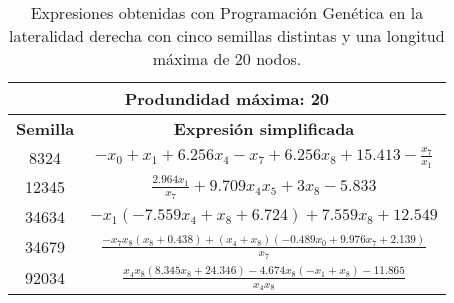 \begin{table}[H]
\centering
\begin{tabular}{|c|c|}
\hline
\multicolumn{2}{|c|}{\textbf{Produndidad máxima: 20}}                                                                                                               \\ \hline
\textbf{Semilla} & \textbf{Expresión simplificada}                                                                                                                  \\ \hline
8324             & $- x_{0} + x_{1} + 6.256 x_{4} - x_{7} + 6.256 x_{8} + 15.413 - \frac{x_{7}}{x_{1}}$                                              \\ \hline
12345            & $\frac{2.964 x_{1}}{x_{7}} + 9.709 x_{4} x_{5} + 3 x_{8} - 5.833$                                                                       \\ \hline
34634            & $- x_{1} \left(- 7.559 x_{4} + x_{8} + 6.724\right) + 7.559 x_{8} + 12.549$                                                          \\ \hline
34679            & $\frac{- x_{7} x_{8} \left(x_{8} + 0.438\right) + \left(x_{4} + x_{8}\right) \left(- 0.489 x_{0} + 9.976 x_{7} + 2.139\right)}{x_{7}}$ \\ \hline
92034            & $\frac{x_{4} x_{8} \left(8.345 x_{8} + 24.346\right) - 4.674 x_{8} \left(- x_{1} + x_{8}\right) - 11.865}{x_{4} x_{8}}$  \\ \hline
\end{tabular}%
\caption{Expresiones obtenidas con Programación Genética en la lateralidad derecha con cinco semillas distintas y una longitud máxima de 20 nodos.}\label{table:exp_PG_l1_20}

\end{table}






